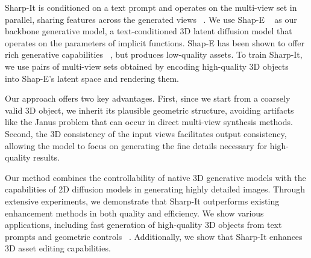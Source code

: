 Sharp-It is conditioned on a text prompt and operates on the multi-view set in parallel, sharing features across the generated views ~\cite{shi2024mvdream, shi2023zero123singleimageconsistent}. We use Shap-E ~\cite{jun2023shape} as our backbone generative model, a text-conditioned 3D latent diffusion model that operates on the parameters of implicit functions. Shap-E has been shown to offer rich generative capabilities ~\cite{chen2023shapeditor, sella2024spicee}, but produces low-quality assets. To train Sharp-It, we use pairs of multi-view sets obtained by encoding high-quality 3D objects ~\cite{Deitke_2023} into Shap-E's latent space and rendering them.


Our approach offers two key advantages. First, since we start from a coarsely valid 3D object, we inherit its plausible geometric structure, avoiding artifacts like the Janus problem that can occur in direct multi-view synthesis methods. Second, the 3D consistency of the input views facilitates output consistency, allowing the model to focus on generating the fine details necessary for high-quality results.


Our method combines the controllability of native 3D generative models with the capabilities of 2D diffusion models in generating highly detailed images. Through extensive experiments, we demonstrate that Sharp-It outperforms existing enhancement methods in both quality and efficiency. We show various applications, including fast generation of high-quality 3D objects from text prompts and geometric controls ~\cite{sella2024spicee}. Additionally, we show that Sharp-It enhances 3D asset editing capabilities.


